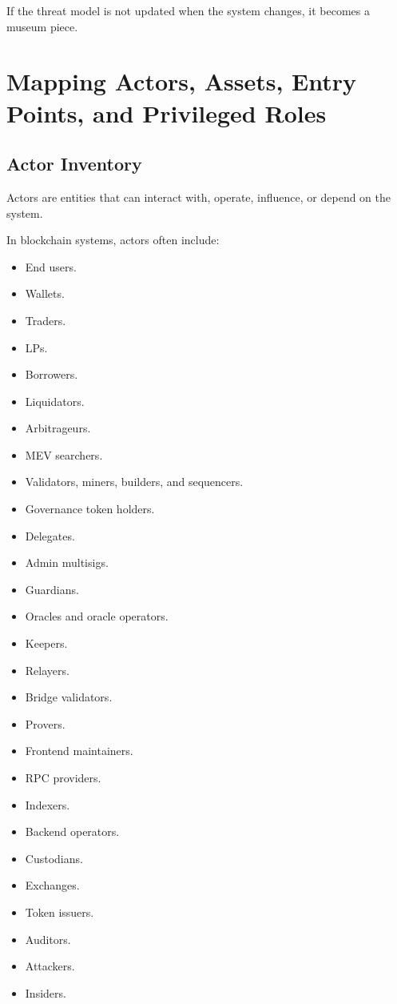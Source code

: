 If the threat model is not updated when the system changes, it becomes a
museum piece.

\section{Mapping Actors, Assets, Entry Points, and Privileged Roles}

\subsection{Actor Inventory}

Actors are entities that can interact with, operate, influence, or
depend on the system.

In blockchain systems, actors often include:

\begin{itemize}
\tightlist
\item
  End users.
\item
  Wallets.
\item
  Traders.
\item
  LPs.
\item
  Borrowers.
\item
  Liquidators.
\item
  Arbitrageurs.
\item
  MEV searchers.
\item
  Validators, miners, builders, and sequencers.
\item
  Governance token holders.
\item
  Delegates.
\item
  Admin multisigs.
\item
  Guardians.
\item
  Oracles and oracle operators.
\item
  Keepers.
\item
  Relayers.
\item
  Bridge validators.
\item
  Provers.
\item
  Frontend maintainers.
\item
  RPC providers.
\item
  Indexers.
\item
  Backend operators.
\item
  Custodians.
\item
  Exchanges.
\item
  Token issuers.
\item
  Auditors.
\item
  Attackers.
\item
  Insiders.
\end{itemize}

